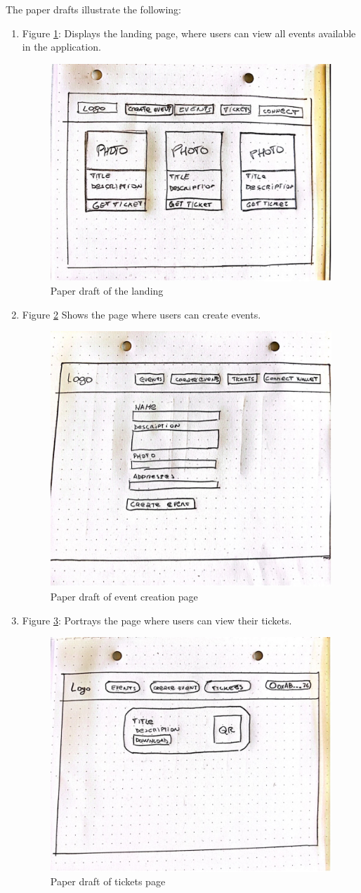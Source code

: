 The paper drafts illustrate the following:
\begin{enumerate}
    \item Figure \ref{Abb3}: Displays the landing page, where users can view all events available in the application.\\
    \begin{figure}[H]
    \centering
    \includegraphics[width=0.5\linewidth]{PICs/Picture1.jpg}
    \caption{Paper draft of the landing}\label{Abb3}
    \end{figure}
    
    \item Figure \ref{Abb4} Shows the page where users can create events.\\
    \begin{figure}[H]
    \centering
    \includegraphics[width=0.5\linewidth]{PICs/Picture2.jpg}
    \caption{Paper draft of event creation page}\label{Abb4}
    \end{figure}
    
    \item Figure \ref{Abb5}: Portrays the page where users can view their tickets.\\
    \begin{figure}[H]
    \centering
    \includegraphics[width=0.5\linewidth]{PICs/Picture3.jpg}
    \caption{Paper draft of tickets page}\label{Abb5}
    \end{figure}
    

\end{enumerate}
